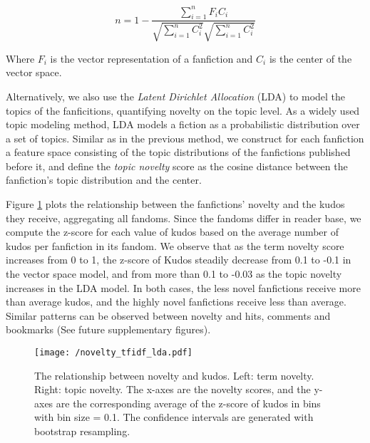 \documentclass[a4paper]{article}
\begin{document}
\begin{equation}
n = 1-\frac{\sum_{i=1}^{n}{F_iC_i}}{\sqrt{\sum_{i=1}^{n}{C_i^2}}\sqrt{\sum_{i=1}^{n}{C_i^2}}}
\end{equation}

Where $F_i$ is the vector representation of a fanfiction and $C_i$ is the center of the vector space.

Alternatively, we also use the \emph{Latent Dirichlet Allocation} (LDA) \cite{blei2003latent} to model the topics of the fanficitions, quantifying novelty on the topic level. As a widely used topic modeling method, LDA models a fiction as a probabilistic distribution over a set of topics. Similar as in the previous method, we construct for each fanfiction a feature space consisting of the topic distributions of the fanfictions published before it, and define the \emph{topic novelty} score as the cosine distance between the fanfiction's topic distribution and the center. 

Figure \ref{fig:tfidf_lda_kudos} plots the relationship between the fanfictions' novelty and the kudos they receive, aggregating all fandoms. Since the fandoms differ in reader base, we compute the z-score for each value of kudos based on the average number of kudos per fanfiction in its fandom. We observe that as the term novelty score increases from 0  to 1, the z-score of Kudos steadily decrease from 0.1 to -0.1 in the vector space model, and from more than 0.1 to -0.03 as the topic novelty increases in the LDA model. In both cases, the less novel fanfictions receive more than average kudos, and the highly novel fanfictions receive less than average. Similar patterns can be observed between novelty and hits, comments and bookmarks (See future supplementary figures).

\begin{figure}
    \centering
          \texttt{[image: /novelty\_tfidf\_lda.pdf]}
        \caption{The relationship between novelty and kudos. Left: term novelty. Right: topic novelty. The x-axes are the novelty scores, and the y-axes are the corresponding average of the z-score of kudos in bins with bin size = 0.1. The confidence intervals are generated with bootstrap resampling. }
        \label{fig:tfidf_lda_kudos}
\end{figure}
\end{document}

